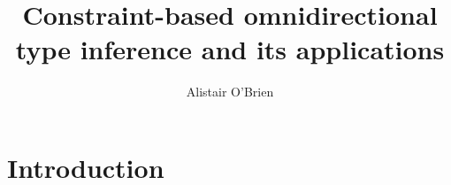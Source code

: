 \documentclass[acmsmall,nonacm]{acmart}
\begin{document}
\title{Constraint-based omnidirectional type inference and its applications}
\author{Alistair O'Brien}


\renewcommand{\shortauthors}{O'Brien et al.}

\begin{abstract}
\end{abstract}

\maketitle


\section{Introduction}




\newpage 
\appendix 
\end{document}
